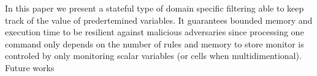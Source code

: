 In this paper we present a stateful type of domain specific filtering able to
keep track of the value of predertemined variables.
It guarantees bounded memory and execution time to be resilient against
malicious adversaries since processing one command only depends on the number of
rules and memory to store monitor is controled by only monitoring scalar
variables (or cells when multidimentional).
\TODO Future works
